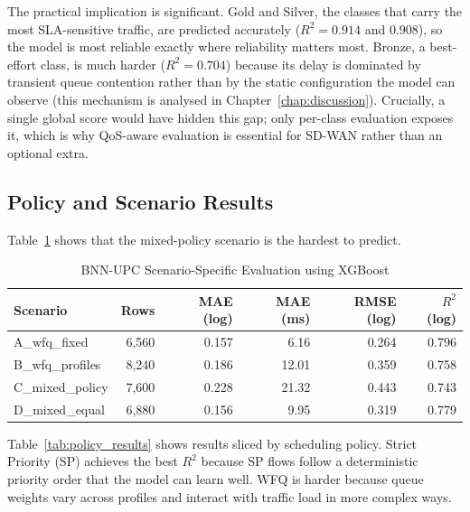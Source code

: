 \documentclass[a4paper,12pt]{Classes/RoboticsLaTeX}
\begin{document}
The practical implication is significant. Gold and Silver, the classes that carry the most SLA-sensitive traffic, are predicted accurately ($R^2 = 0.914$ and $0.908$), so the model is most reliable exactly where reliability matters most. Bronze, a best-effort class, is much harder ($R^2 = 0.704$) because its delay is dominated by transient queue contention rather than by the static configuration the model can observe (this mechanism is analysed in Chapter~\ref{chap:discussion}). Crucially, a single global score would have hidden this gap; only per-class evaluation exposes it, which is why QoS-aware evaluation is essential for SD-WAN rather than an optional extra.

\subsection{Policy and Scenario Results}

Table~\ref{tab:scenario_results} shows that the mixed-policy scenario is the hardest to predict.

\begin{table}[H]
\centering
\caption{BNN-UPC Scenario-Specific Evaluation using XGBoost}
\label{tab:scenario_results}
\begingroup
\footnotesize
\setlength{\tabcolsep}{4pt}
\begin{tabular}{|l|r|r|r|r|r|}
\hline
\textbf{Scenario} & \textbf{Rows} & \textbf{MAE (log)} & \textbf{MAE (ms)} & \textbf{RMSE (log)} & \textbf{$R^2$ (log)} \\
\hline
A\_wfq\_fixed & 6,560 & 0.157 & 6.16 & 0.264 & 0.796 \\
\hline
B\_wfq\_profiles & 8,240 & 0.186 & 12.01 & 0.359 & 0.758 \\
\hline
C\_mixed\_policy & 7,600 & 0.228 & 21.32 & 0.443 & 0.743 \\
\hline
D\_mixed\_equal & 6,880 & 0.156 & 9.95 & 0.319 & 0.779 \\
\hline
\end{tabular}
\endgroup
\end{table}

Table~\ref{tab:policy_results} shows results sliced by scheduling policy. Strict Priority (SP) achieves the best $R^2$ because SP flows follow a deterministic priority order that the model can learn well. WFQ is harder because queue weights vary across profiles and interact with traffic load in more complex ways.
\end{document}

